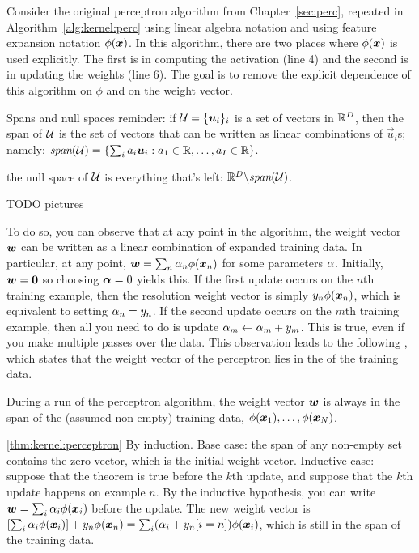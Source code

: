 Consider the original perceptron algorithm from
Chapter~\ref{sec:perc}, repeated in Algorithm~\ref{alg:kernel:perc}
using linear algebra notation and using feature expansion notation
$\phi({\boldsymbol{x}})$.  In this algorithm, there are two places where
$\phi({\boldsymbol{x}})$ is used explicitly.  The first is in computing the
activation (line 4) and the second is in updating the weights (line
6).  The goal is to remove the explicit dependence of this algorithm
on $\phi$ and on the weight vector.

\begin{mathreview}{Spans and null spaces}
  reminder: if $\mathcal{U} = \{ \boldsymbol{u}_i \}_i$ is a set of vectors in $\mathbb{R}^D$, then
  the span of $\mathcal{U}$ is the set of vectors that can be written as
  linear combinations of $\vec u_i$s; namely: $\textit{span}(\mathcal{U}) = \{
  \sum_i a_i \boldsymbol{u}_i : a_1 \in \mathbb{R}, \dots, a_I \in \mathbb{R} \}$.

  the null space of $\mathcal{U}$ is everything that's left: $\mathbb{R}^D \backslash
  \textit{span}(\mathcal{U})$.

  TODO pictures
\end{mathreview}

To do so, you can observe that at any point in the algorithm, the
weight vector ${\boldsymbol{w}}$ can be written as a linear combination of expanded
training data.  In particular, at any point, ${\boldsymbol{w}} = \sum_n \alpha_n
\phi({\boldsymbol{x}}_n)$ for some parameters $\alpha$.  Initially, ${\boldsymbol{w}} = \boldsymbol{0}$ so
choosing $\boldsymbol{\alpha} = 0$ yields this.  If the first update occurs on the
$n$th training example, then the resolution weight vector is simply
$y_n \phi({\boldsymbol{x}}_n)$, which is equivalent to setting $\alpha_n = y_n$.  If
the second update occurs on the $m$th training example, then all you
need to do is update $\alpha_m \leftarrow \alpha_m + y_m$.  This is true,
even if you make multiple passes over the data.  This observation
leads to the following , which states
that the weight vector of the perceptron lies in the  of
the training data.

\begin{theorem} \label{thm:kernel:perceptron}
  During a run of the perceptron algorithm, the weight vector ${\boldsymbol{w}}$ is
  always in the span of the (assumed non-empty) training data,
  $\phi({\boldsymbol{x}}_1), \dots, \phi({\boldsymbol{x}}_N)$.
\end{theorem}
\begin{myproof}{\ref{thm:kernel:perceptron}}
  By induction.  Base case: the span of any non-empty set contains the
  zero vector, which is the initial weight vector.  Inductive case:
  suppose that the theorem is true before the $k$th update, and
  suppose that the $k$th update happens on example $n$.  By the
  inductive hypothesis, you can write ${\boldsymbol{w}} = \sum_i \alpha_i \phi({\boldsymbol{x}}_i)$
  before the update.  The new weight vector is $\left[ \sum_i \alpha_i
    \phi({\boldsymbol{x}}_i) \right] + y_n \phi({\boldsymbol{x}}_n) = \sum_i (\alpha_i + y_n[i=n])
  \phi({\boldsymbol{x}}_i)$, which is still in the span of the training data.
\end{myproof}

